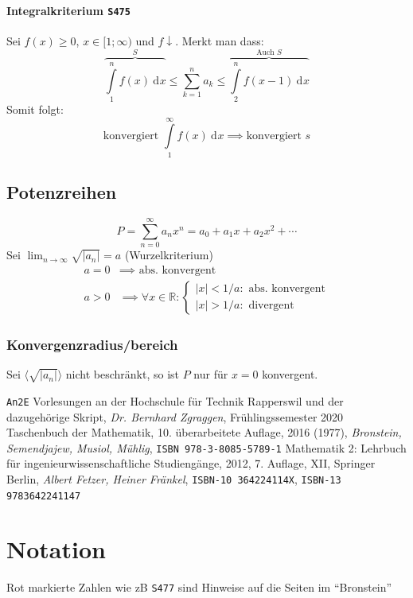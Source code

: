 \documentclass[a4paper, twocolumn]{article}
\numberwithin{equation}{subsection}
\newcommand{\dd}[2][]{\ensuremath{~\mathrm{d}^{#1} #2}}
\newcommand{\brpage}[1]{\textcolor{red!70!black}{\small\texttt{S#1}}}
\begin{document}
\paragraph{Integralkriterium \brpage{475}}
Sei \(f(x) \geq 0\), \(x \in [1;\infty)\) und \(f\downarrow\). Merkt man dass:
\[
    \overbrace{\int\limits_1^n f(x) \dd{x}}^{S} 
    \leq \sum_{k=1}^n a_k
    \leq \overbrace{\int\limits_2^n f(x-1) \dd{x}}^{\text{Auch } S}
\]
Somit folgt:
\[
    \text{konvergiert } \int\limits_1^\infty f(x) \dd{x}
    \implies \text{konvergiert } s
\]

\subsection{Potenzreihen} \label{sec:powerseries}
\[
    P = \sum_{n=0}^\infty a_n x^n = a_0 + a_1 x + a_2 x^2 + \cdots
\]
Sei \(\lim_{n\to\infty} \sqrt{|a_n|} = a \) (Wurzelkriterium)
\begin{align*}
    a = 0 &\implies \text{ abs. konvergent} \\
    a > 0 &\implies
    \forall x \in \mathbb{R}:
    \begin{cases}
        |x| < 1/a: \text{ abs. konvergent} \\
        |x| > 1/a: \text{ divergent}
    \end{cases}
\end{align*}
\subsubsection{Konvergenzradius/bereich}
Sei \(\langle \sqrt{|a_n|}\rangle\) nicht beschr\"ankt, so ist \(P\) nur f\"ur \(x=0\) konvergent.

\begin{thebibliography}{3}
    \texttt{An2E} Vorlesungen an der Hochschule f\"ur Technik Rapperswil und der dazugeh\"orige Skript,
    \textit{Dr. Bernhard Zgraggen}, Fr\"uhlingssemester 2020
    Taschenbuch der Mathematik,
    10. \"uberarbeitete Auflage, 2016 (1977),
    \textit{Bronstein, Semendjajew, Musiol, M\"uhlig}, 
    \texttt{ISBN 978-3-8085-5789-1}
    Mathematik 2: Lehrbuch für ingenieurwissenschaftliche Studieng\"ange,
    2012, 7. Auflage, XII, Springer Berlin,
    \textit{Albert Fetzer, Heiner Fränkel},
    \texttt{ISBN-10 364224114X},
    \texttt{ISBN-13 9783642241147}
    
\end{thebibliography}

\section*{Notation}
Rot markierte Zahlen wie zB \brpage{477} sind Hinweise auf die Seiten im ``Bronstein'' \cite{bronstein}
\end{document}
